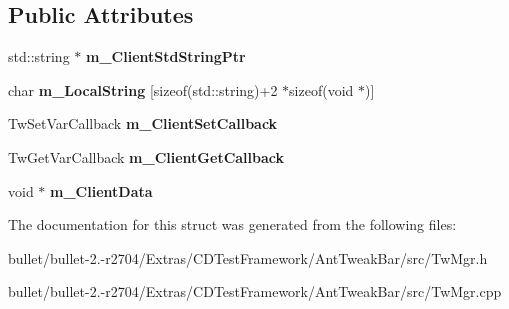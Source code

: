 \subsection*{Public Attributes}
\begin{DoxyCompactItemize}
\item 
\hypertarget{struct_c_tw_mgr_1_1_c_c_d_std_string_a552c47745a4cbb8c81514da2be3728a9}{std\+::string $\ast$ {\bfseries m\+\_\+\+Client\+Std\+String\+Ptr}}\label{struct_c_tw_mgr_1_1_c_c_d_std_string_a552c47745a4cbb8c81514da2be3728a9}

\item 
\hypertarget{struct_c_tw_mgr_1_1_c_c_d_std_string_aa8af217308973ee5c485d3da7e10a284}{char {\bfseries m\+\_\+\+Local\+String} \mbox{[}sizeof(std\+::string)+2 $\ast$sizeof(void $\ast$)\mbox{]}}\label{struct_c_tw_mgr_1_1_c_c_d_std_string_aa8af217308973ee5c485d3da7e10a284}

\item 
\hypertarget{struct_c_tw_mgr_1_1_c_c_d_std_string_a710d4c1d691305f03cdd817c541b0940}{Tw\+Set\+Var\+Callback {\bfseries m\+\_\+\+Client\+Set\+Callback}}\label{struct_c_tw_mgr_1_1_c_c_d_std_string_a710d4c1d691305f03cdd817c541b0940}

\item 
\hypertarget{struct_c_tw_mgr_1_1_c_c_d_std_string_a0b781fe69170c6596c6c1b705b1b9629}{Tw\+Get\+Var\+Callback {\bfseries m\+\_\+\+Client\+Get\+Callback}}\label{struct_c_tw_mgr_1_1_c_c_d_std_string_a0b781fe69170c6596c6c1b705b1b9629}

\item 
\hypertarget{struct_c_tw_mgr_1_1_c_c_d_std_string_aef92a70d48bf7b9594f90803f880318f}{void $\ast$ {\bfseries m\+\_\+\+Client\+Data}}\label{struct_c_tw_mgr_1_1_c_c_d_std_string_aef92a70d48bf7b9594f90803f880318f}

\end{DoxyCompactItemize}


The documentation for this struct was generated from the following files\+:\begin{DoxyCompactItemize}
\item 
bullet/bullet-\/2.-\/r2704/\+Extras/\+C\+D\+Test\+Framework/\+Ant\+Tweak\+Bar/src/Tw\+Mgr.\+h\item 
bullet/bullet-\/2.-\/r2704/\+Extras/\+C\+D\+Test\+Framework/\+Ant\+Tweak\+Bar/src/Tw\+Mgr.\+cpp\end{DoxyCompactItemize}
